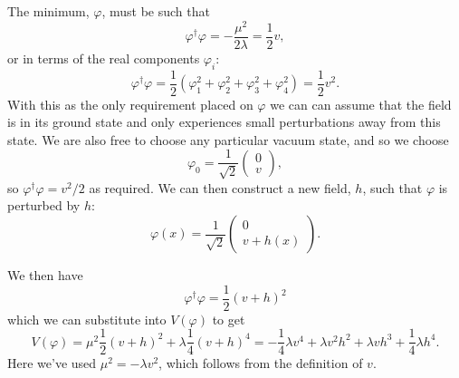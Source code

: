 \documentclass[fleqn]{NotesClass}
\newcommand{\hermit}{\dagger}
\begin{document}
    The minimum, \(\varphi\), must be such that
    \begin{equation}
        \varphi^\hermit \varphi = -\frac{\mu^2}{2\lambda} = \frac{1}{2}v,
    \end{equation}
    or in terms of the real components \(\varphi_i\):
    \begin{equation}
        \varphi^\hermit \varphi = \frac{1}{2}(\varphi_1^2 + \varphi_2^2 + \varphi_3^2 + \varphi_4^2) = \frac{1}{2}v^2.
    \end{equation}
    With this as the only requirement placed on \(\varphi\) we can can assume that the field is in its ground state and only experiences small perturbations away from this state.
    We are also free to choose any particular vacuum state, and so we choose
    \begin{equation}
        \varphi_0 = \frac{1}{\sqrt{2}}
        \begin{pmatrix}
            0\\ v
        \end{pmatrix}
        ,
    \end{equation}
    so \(\varphi^\hermit \varphi = v^2/2\) as required.
    We can then construct a new field, \(h\), such that \(\varphi\) is perturbed by \(h\):
    \begin{equation}
        \varphi(x) = \frac{1}{\sqrt{2}} 
        \begin{pmatrix}
            0\\ v + h(x)
        \end{pmatrix}
        .
    \end{equation}
    
    We then have
    \begin{equation}
        \varphi^\hermit \varphi = \frac{1}{2}(v + h)^2
    \end{equation}
    which we can substitute into \(V(\varphi)\) to get
    \begin{equation}
        V(\varphi) = \mu^2 \frac{1}{2}(v + h)^2 + \lambda\frac{1}{4}(v + h)^4 = -\frac{1}{4}\lambda v^4 + \lambda v^2 h^2 + \lambda v h^3 + \frac{1}{4}\lambda h^4.
    \end{equation}
    Here we've used \(\mu^2 = -\lambda v^2\), which follows from the definition of \(v\).
    
\end{document}
